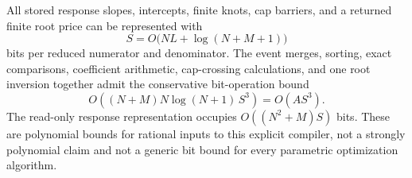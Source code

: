 \begin{theorem}\label{thm:bit}
All stored response slopes, intercepts, finite knots, cap barriers, and a returned finite root price can be represented with
\begin{equation}\label{eq:bitheight}
 S=O\bigl(NL+\log(N+M+1)\bigr)
\end{equation}
bits per reduced numerator and denominator. The event merges, sorting, exact comparisons, coefficient arithmetic, cap-crossing calculations, and one root inversion together admit the conservative bit-operation bound
\begin{equation}\label{eq:turing}
 O\!\left((N+M)N\log(N+1)\,S^3\right)=O(AS^3).
\end{equation}
The read-only response representation occupies $O((N^2+M)S)$ bits. These are polynomial bounds for rational inputs to this explicit compiler, not a strongly polynomial claim and not a generic bit bound for every parametric optimization algorithm.
\end{theorem}
